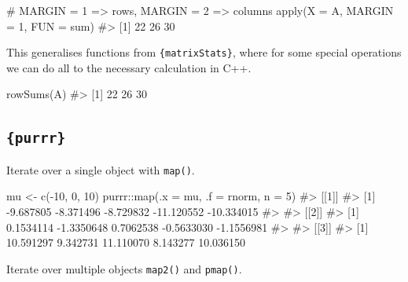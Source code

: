 \documentclass[
  letterpaper,
  DIV=11,
  numbers=noendperiod]{scrreprt}
\newenvironment{Shaded}{\begin{snugshade}}{\end{snugshade}}
\newcommand{\AttributeTok}[1]{\textcolor[rgb]{0.40,0.45,0.13}{#1}}
\newcommand{\CommentTok}[1]{\textcolor[rgb]{0.37,0.37,0.37}{#1}}
\newcommand{\DecValTok}[1]{\textcolor[rgb]{0.68,0.00,0.00}{#1}}
\newcommand{\FunctionTok}[1]{\textcolor[rgb]{0.28,0.35,0.67}{#1}}
\newcommand{\NormalTok}[1]{\textcolor[rgb]{0.00,0.23,0.31}{#1}}
\newcommand{\OtherTok}[1]{\textcolor[rgb]{0.00,0.23,0.31}{#1}}
\newcommand{\SpecialCharTok}[1]{\textcolor[rgb]{0.37,0.37,0.37}{#1}}
\begin{document}
\begin{Shaded}
\begin{Highlighting}[]
\CommentTok{\# MARGIN = 1 =\textgreater{} rows,  MARGIN = 2 =\textgreater{} columns}
\FunctionTok{apply}\NormalTok{(}\AttributeTok{X =}\NormalTok{ A, }\AttributeTok{MARGIN =} \DecValTok{1}\NormalTok{, }\AttributeTok{FUN =}\NormalTok{ sum)}
\CommentTok{\#\textgreater{} [1] 22 26 30}
\end{Highlighting}
\end{Shaded}

This generalises functions from \texttt{\{matrixStats\}}, where for some
special operations we can do all to the necessary calculation in C++.

\begin{Shaded}
\begin{Highlighting}[]
\FunctionTok{rowSums}\NormalTok{(A)}
\CommentTok{\#\textgreater{} [1] 22 26 30}
\end{Highlighting}
\end{Shaded}

\subsection{\texorpdfstring{\texttt{\{purrr\}}}{\{purrr\}}}\label{purrr}

Iterate over a single object with \texttt{map()}.

\begin{Shaded}
\begin{Highlighting}[]
\NormalTok{mu }\OtherTok{\textless{}{-}} \FunctionTok{c}\NormalTok{(}\SpecialCharTok{{-}}\DecValTok{10}\NormalTok{, }\DecValTok{0}\NormalTok{, }\DecValTok{10}\NormalTok{)}
\NormalTok{purrr}\SpecialCharTok{::}\FunctionTok{map}\NormalTok{(}\AttributeTok{.x =}\NormalTok{ mu, }\AttributeTok{.f =}\NormalTok{ rnorm, }\AttributeTok{n =} \DecValTok{5}\NormalTok{)}
\CommentTok{\#\textgreater{} [[1]]}
\CommentTok{\#\textgreater{} [1]  {-}9.687805  {-}8.371496  {-}8.729832 {-}11.120552 {-}10.334015}
\CommentTok{\#\textgreater{} }
\CommentTok{\#\textgreater{} [[2]]}
\CommentTok{\#\textgreater{} [1]  0.1534114 {-}1.3350648  0.7062538 {-}0.5633030 {-}1.1556981}
\CommentTok{\#\textgreater{} }
\CommentTok{\#\textgreater{} [[3]]}
\CommentTok{\#\textgreater{} [1] 10.591297  9.342731 11.110070  8.143277 10.036150}
\end{Highlighting}
\end{Shaded}

Iterate over multiple objects \texttt{map2()} and \texttt{pmap()}.
\end{document}
